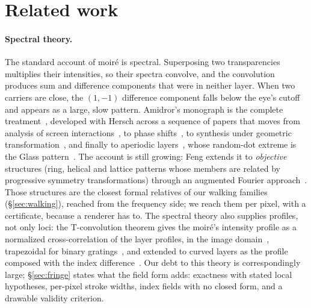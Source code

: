 \section{Related work}
\label{sec:related}

\paragraph{Spectral theory.}
The standard account of moir\'e is spectral. Superposing two transparencies
multiplies their intensities, so their spectra convolve, and the convolution
produces sum and difference components that were in neither layer. When two
carriers are close, the $(1,-1)$ difference component falls below the eye's cutoff
and appears as a large, slow pattern. Amidror's monograph is the complete
treatment~\cite{Amidror2009Theory}, developed with Hersch across a sequence of
papers that moves from analysis of screen interactions~\cite{Amidror1994Spectral},
to phase shifts~\cite{Amidror1996Fourier}, to synthesis under geometric
transformation~\cite{Amidror1998Fourier}, and finally to aperiodic
layers~\cite{Amidror2003Moire, AmidrorII}, whose random-dot extreme is the Glass
pattern~\cite{Glass1969Moire}. The account is still growing: Feng extends it to
\emph{objective} structures (ring, helical and lattice patterns whose members
are related by progressive symmetry transformations) through an augmented
Fourier approach~\cite{Feng2025Objective}. Those structures are the closest
formal relatives of our walking families (\S\ref{sec:walking}), reached from the
frequency side; we reach them per pixel, with a certificate, because a renderer
has to. The spectral theory also supplies profiles, not only loci: the
T-convolution theorem gives the moir\'e's intensity profile as a normalized
cross-correlation of the layer profiles, in the image
domain~\cite{Amidror1994TConv}, trapezoidal for binary
gratings~\cite{Patorski1976Profile}, and extended to curved layers as the
profile composed with the index difference~\cite{Amidror1998Fourier}. Our debt
to this theory is correspondingly large; \S\ref{sec:fringe} states what the
field form adds: exactness with stated local hypotheses, per-pixel stroke
widths, index fields with no closed form, and a drawable validity criterion.

